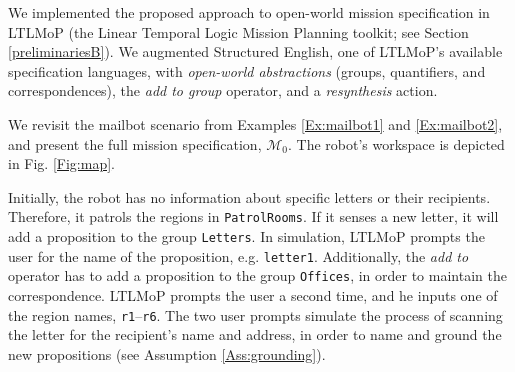 We implemented the proposed approach to open-world mission specification in LTLMoP (the Linear Temporal Logic Mission Planning toolkit; see Section \ref{preliminariesB}). We augmented Structured English, one of LTLMoP's available specification languages, with \emph{open-world abstractions} (groups, quantifiers, and correspondences), the \emph{add to group} operator, and a \emph{resynthesis} action.

\begin{myExample}\label{Ex:mailbot3} We revisit the mailbot scenario from Examples \ref{Ex:mailbot1} and \ref{Ex:mailbot2}, and present the full mission specification, $\mathcal{M}_0$. The robot's workspace is depicted in Fig. \ref{Fig:map}.
\end{myExample}

Initially, the robot has no information about specific letters or their recipients. Therefore, it patrols the regions in \texttt{PatrolRooms}. If it senses a new letter, it will add a proposition to the group \texttt{Letters}. In simulation, LTLMoP prompts the user for the name of the proposition, e.g. \texttt{letter1}. Additionally, the \emph{add to} operator has to add a proposition to the group \texttt{Offices}, in order to maintain the correspondence. LTLMoP prompts the user a second time, and he inputs one of the region names, \texttt{r1}--\texttt{r6}. The two user prompts simulate the process of scanning the letter for the recipient's name and address, in order to name and ground the new propositions (see Assumption \ref{Ass:grounding}).

